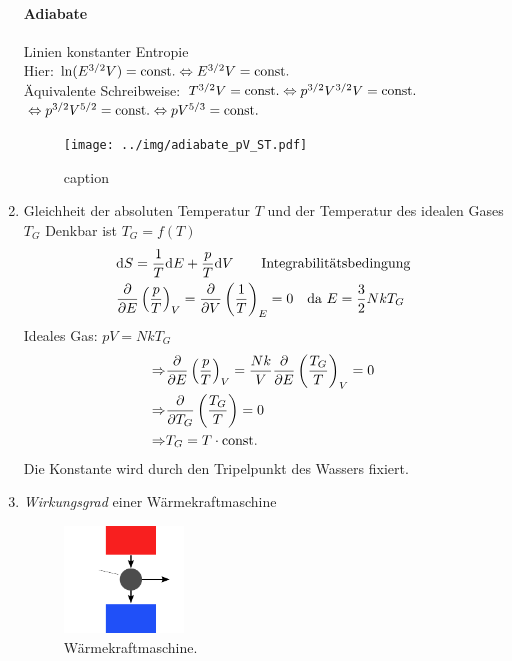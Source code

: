 \begin{enumerate}
    \paragraph{Adiabate} Linien konstanter Entropie \\
    Hier: $\ln(E^{3/2} V) = \text{const.} \Leftrightarrow E^{3/2} V = \text{const.}$ \\
    Äquivalente Schreibweise: $T^{3/2} V = \text{const.} \Leftrightarrow p^{3/2} V^{3/2} V = \text{const.}$ \\
    $\Leftrightarrow p^{3/2} V^{5/2} = \text{const.} \Leftrightarrow p V^{5/3} = \text{const.}$
    \begin{figure}[H]
        \begin{center}
            \texttt{[image: ../img/adiabate\_pV\_ST.pdf]}
            \caption{caption}  %
            \label{img:adiabate_pV_ST}
        \end{center}
    \end{figure}
    \item Gleichheit der absoluten Temperatur $T$ und der Temperatur des idealen Gases $T_G$
    Denkbar ist $T_G = f(T)$
    \begin{equation}
        \begin{split}
            & \mathrm{d} S = \frac{1}{T} \mathrm{d} E + \frac{p}{T}\mathrm{d} V \qquad \text{Integrabilitätsbedingung} \\
            & \frac{\partial}{\partial E} \left( \frac{p}{T} \right)_V = \frac{\partial}{\partial V} \left( \frac{1}{T} \right)_E = 0 \quad \text{da } E = \frac{3}{2} N k T_G
        \end{split}
    \end{equation}
    Ideales Gas: $p V = N k T_G$
    \begin{equation}
        \begin{split}
            \Rightarrow & \frac{\partial}{\partial E} \left( \frac{p}{T} \right)_V = \frac{N k }{V} \frac{\partial}{\partial E} \left( \frac{T_G}{T} \right)_V = 0 \\
            \Rightarrow & \frac{\partial}{\partial T_G} \left( \frac{T_G}{T} \right) = 0 \\
            \Rightarrow & T_G = T \cdot \text{const.}
        \end{split}
    \end{equation}
    Die Konstante wird durch den Tripelpunkt des Wassers fixiert.
    \item \emph{Wirkungsgrad} einer Wärmekraftmaschine
    \begin{figure}[H]
        \begin{center}
            \includegraphics[width=0.3\textwidth]{../img/waermekraftmaschine.pdf}
            \caption{Wärmekraftmaschine.}
            \label{img:waermekraftmaschine}
        \end{center}
    \end{figure}
    

\end{enumerate}
